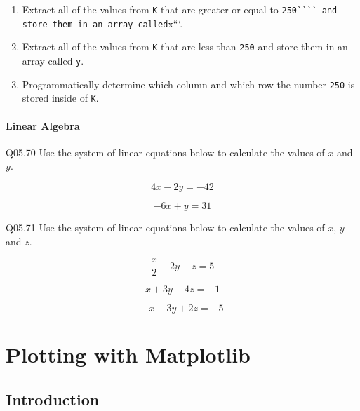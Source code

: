 \documentclass{book}
\newcommand{\passthrough}[1]{#1}
\begin{document}
\begin{enumerate}
\def\labelenumi{(\alph{enumi})}
\item
  Extract all of the values from \passthrough{\lstinline!K!} that are
  greater or equal to
  \passthrough{\lstinline!250```` and store them in an array called!}x```.
\item
  Extract all of the values from \passthrough{\lstinline!K!} that are
  less than \passthrough{\lstinline!250!} and store them in an array
  called \passthrough{\lstinline!y!}.
\item
  Programmatically determine which column and which row the number
  \passthrough{\lstinline!250!} is stored inside of
  \passthrough{\lstinline!K!}.
\end{enumerate}
    




    
        \hypertarget{linear-algebra}{%
\subsubsection{Linear Algebra}\label{linear-algebra}}
    




    
        Q05.70 Use the system of linear equations below to calculate the values
of \(x\) and \(y\).

\[ 4x - 2y = -42 \]

\[ -6x + y = 31 \]

Q05.71 Use the system of linear equations below to calculate the values
of \(x\), \(y\) and \(z\).

\[ \frac{x}{2} +2y - z = 5 \]

\[ x + 3y - 4z = -1 \]

\[ -x - 3y + 2z = -5 \]
    




    
        \hypertarget{plotting-with-matplotlib}{%
\chapter{Plotting with Matplotlib}\label{plotting-with-matplotlib}}
    




    
        \hypertarget{introduction}{%
\section{Introduction}\label{introduction}}
    
\end{document}

